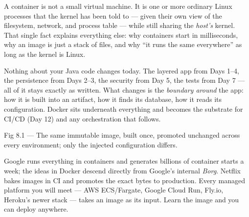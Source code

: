 \begin{keyidea}
A container is not a small virtual machine. It is one or more ordinary Linux processes that the kernel has been told to  --- given their own view of the filesystem, network, and process table --- while still sharing the \emph{host's} kernel. That single fact explains everything else: why containers start in milliseconds, why an image is just a stack of files, and why ``it runs the same everywhere'' as long as the kernel is Linux.
\end{keyidea}

 Nothing about your Java code changes today. The layered app from Days 1--4, the persistence from Days 2--3, the security from Day 5, the tests from Day 7 --- all of it stays exactly as written. What changes is the \emph{boundary around} the app: how it is built into an artifact, how it finds its database, how it reads its configuration. Docker sits underneath everything and becomes the substrate for CI/CD (Day 12) and any orchestration that follows.

\begin{wbfigure}{Fig 8.1 --- The same immutable image, built once, promoted unchanged across every environment; only the injected configuration differs.}
\end{wbfigure}

 Google runs everything in containers and generates billions of container starts a week; the ideas in Docker descend directly from Google's internal \emph{Borg}. Netflix bakes images in CI and promotes the exact bytes to production. Every managed platform you will meet --- AWS ECS/Fargate, Google Cloud Run, Fly.io, Heroku's newer stack --- takes an image as its input. Learn the image and you can deploy anywhere.

